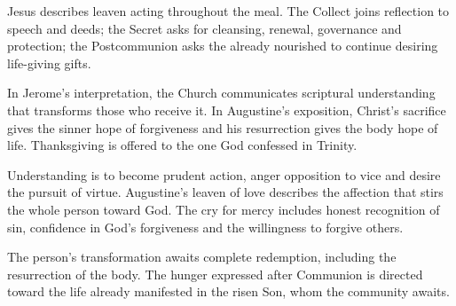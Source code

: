 \begin{fourSenses}
\item[Literal.] Jesus describes leaven acting throughout the meal. The Collect joins reflection to speech and deeds; the Secret asks for cleansing, renewal, governance and protection; the Postcommunion asks the already nourished to continue desiring life-giving gifts.
\item[Allegorical.] In Jerome's interpretation, the Church communicates scriptural understanding that transforms those who receive it. In Augustine's exposition, Christ's sacrifice gives the sinner hope of forgiveness and his resurrection gives the body hope of life. Thanksgiving is offered to the one God confessed in Trinity.
\item[Moral.] Understanding is to become prudent action, anger opposition to vice and desire the pursuit of virtue. Augustine's leaven of love describes the affection that stirs the whole person toward God. The cry for mercy includes honest recognition of sin, confidence in God's forgiveness and the willingness to forgive others.
\item[Anagogical.] The person's transformation awaits complete redemption, including the resurrection of the body. The hunger expressed after Communion is directed toward the life already manifested in the risen Son, whom the community awaits.
\end{fourSenses}
